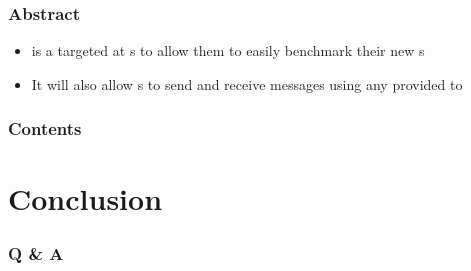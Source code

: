\documentclass[aspectratio=169]{beamer}
\title[\tc]{\deliv{\srs}{Presentation}}
\date{\datesrs}
\begin{document}

\begin{frame}
\maketitle
\begin{center}
\names
\end{center}
\end{frame}

\begin{frame}
\frametitle{Abstract}
\begin{itemize}
\item \cry{} is a \cf{} targeted at \cg s to allow them to
easily benchmark their new \cs s
\item It will also allow \eu s to send and receive messages
using any \cs{} provided to \cry
\end{itemize}
\end{frame}

\begin{frame}
\frametitle{Contents}
\setlength{\columnsep}{0.11in}
\begin{multicols}{2}
\tableofcontents
\end{multicols}
\end{frame}








\section{Conclusion}
\begin{frame}
\frametitle{Q \& A}
\github
\end{frame}

\end{document}
